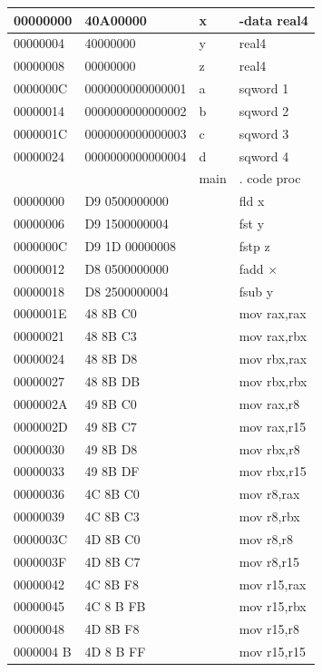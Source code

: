 \documentclass[10pt]{article}
\begin{document}
\begin{center}
\begin{tabular}{|l|l|l|l|}
\hline
00000000 & 40A00000 & x & -data real4 \\
\hline
00000004 & 40000000 & y & real4 \\
\hline
00000008 & 00000000 & z & real4 \\
\hline
0000000C & 0000000000000001 & a & sqword 1 \\
\hline
00000014 & 0000000000000002 & b & sqword 2 \\
\hline
0000001C & 0000000000000003 & c & sqword 3 \\
\hline
00000024 & 0000000000000004 & d & sqword 4 \\
\hline
 &  & main & . code proc \\
\hline
00000000 & D9 0500000000 &  & fld x \\
\hline
00000006 & D9 1500000004 &  & fst y \\
\hline
0000000C & D9 1D 00000008 &  & fstp z \\
\hline
00000012 & D8 0500000000 &  & fadd × \\
\hline
00000018 & D8 2500000004 &  & fsub y \\
\hline
0000001E & 48 8B C0 &  & mov rax,rax \\
\hline
00000021 & 48 8B C3 &  & mov rax,rbx \\
\hline
00000024 & 48 8B D8 &  & mov rbx,rax \\
\hline
00000027 & 48 8B DB &  & mov rbx,rbx \\
\hline
0000002A & 49 8B C0 &  & mov rax,r8 \\
\hline
0000002D & 49 8B C7 &  & mov rax,r15 \\
\hline
00000030 & 49 8B D8 &  & mov rbx,r8 \\
\hline
00000033 & 49 8B DF &  & mov rbx,r15 \\
\hline
00000036 & 4C 8B C0 &  & mov r8,rax \\
\hline
00000039 & 4C 8B C3 &  & mov r8,rbx \\
\hline
0000003C & 4D 8B C0 &  & mov r8,r8 \\
\hline
0000003F & 4D 8B C7 &  & mov r8,r15 \\
\hline
00000042 & 4C 8B F8 &  & mov r15,rax \\
\hline
00000045 & 4C 8 B FB &  & mov r15,rbx \\
\hline
00000048 & 4D 8B F8 &  & mov r15,r8 \\
\hline
0000004 B & 4D 8 B FF &  & mov r15,r15 \\
\hline
\end{tabular}
\end{center}
\end{document}
